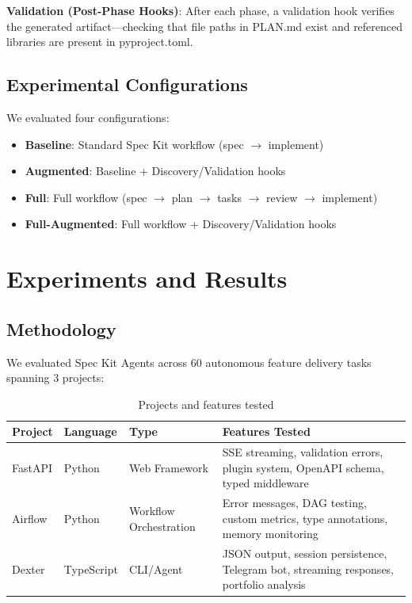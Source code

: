 \documentclass[sigconf,anonymous,review]{acmart}
\begin{document}
\textbf{Validation (Post-Phase Hooks)}: After each phase, a validation hook verifies the generated artifact---checking that file paths in PLAN.md exist and referenced libraries are present in pyproject.toml.

\subsection{Experimental Configurations}

We evaluated four configurations:

\begin{itemize}
  \item \textbf{Baseline}: Standard Spec Kit workflow (spec $\rightarrow$ implement)
  \item \textbf{Augmented}: Baseline + Discovery/Validation hooks
  \item \textbf{Full}: Full workflow (spec $\rightarrow$ plan $\rightarrow$ tasks $\rightarrow$ review $\rightarrow$ implement)
  \item \textbf{Full-Augmented}: Full workflow + Discovery/Validation hooks
\end{itemize}

\section{Experiments and Results}

\subsection{Methodology}

We evaluated Spec Kit Agents across 60 autonomous feature delivery tasks spanning 3 projects:

\begin{table}[h]
  \centering
  \caption{Projects and features tested}
  \label{tab:projects}
  \begin{tabular}{lllp{5cm}}
    \hline
    \textbf{Project} & \textbf{Language} & \textbf{Type} & \textbf{Features Tested} \\
    \hline
    FastAPI & Python & Web Framework & SSE streaming, validation errors, plugin system, OpenAPI schema, typed middleware \\
    Airflow & Python & Workflow Orchestration & Error messages, DAG testing, custom metrics, type annotations, memory monitoring \\
    Dexter & TypeScript & CLI/Agent & JSON output, session persistence, Telegram bot, streaming responses, portfolio analysis \\
    \hline
  \end{tabular}
\end{table}
\end{document}
